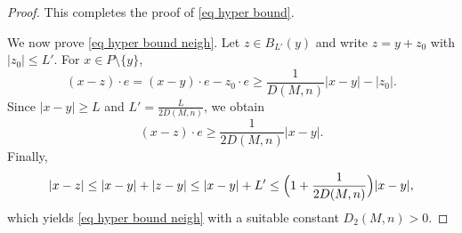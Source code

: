 \documentclass[11pt,letterpaper,reqno]{amsart}
\theoremstyle{plain}%
\theoremstyle{definition}
\numberwithin{equation}{section}
\numberwithin{figure}{section}
\begin{document}
\begin{proof}
This completes the proof of \eqref{eq hyper bound}.

\medskip

We now prove \eqref{eq hyper bound neigh}.  
Let \(z\in B_{L'}(y)\) and write \(z=y+z_0\) with \(|z_0|\le L'\).  
For \(x\in P\setminus\{y\}\),
\[
(x-z)\cdot e
=
(x-y)\cdot e - z_0\cdot e
\ge
\frac{1}{D(M,n)}|x-y|-|z_0|.
\]
Since \(|x-y|\ge L\) and 
\(L'=\frac{L}{2D(M,n)}\), we obtain
\[
(x-z)\cdot e
\ge
\frac{1}{2D(M,n)}|x-y|.
\]
Finally,
\[
|x-z|
\le
|x-y|+|z-y|
\le
|x-y|+L'
\le
\Bigl(1+\frac{1}{2D(M,n)}\Bigr)|x-y|,
\]
which yields \eqref{eq hyper bound neigh} with a suitable constant 
\(D_2(M,n)>0\).
\end{proof}





	
\end{document}
